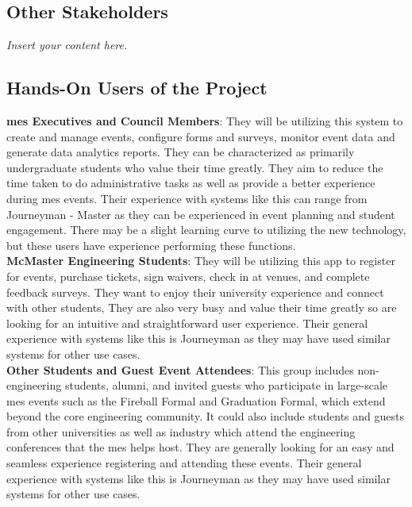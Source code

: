 \documentclass[12pt]{article}
\newcommand{\lips}{\textit{Insert your content here.}}
\begin{document}
\subsection{Other Stakeholders}
\lips
\subsection{Hands-On Users of the Project}
\textbf{\gls{mes} Executives and Council Members}: They will be utilizing this system to create and manage events,
configure forms and surveys, monitor event data and generate data analytics reports. They can be characterized as
primarily undergraduate students who value their time greatly. They aim to reduce the time taken to do administrative
tasks as well as provide a better experience during \gls{mes} events. Their experience with systems like this can range
from Journeyman - Master as they can be experienced in event planning and student engagement. There may be a slight
learning curve to utilizing the new technology, but these users have experience performing these functions.\\
\newline
\textbf{McMaster Engineering Students}: They will be utilizing this app to register for events, purchase tickets, sign
waivers, check in at venues, and complete feedback surveys. They want to enjoy their university experience and connect
with other students, They are also very busy and value their time greatly so are looking for an intuitive and
straightforward user experience. Their general experience with systems like this is Journeyman as they may have used
similar systems for other use cases. \\
\newline
\textbf{Other Students and Guest Event Attendees}: This group includes non-engineering students, alumni, and invited
guests who participate in large-scale \gls{mes} events such as the Fireball Formal and Graduation Formal, which extend
beyond the core engineering community. It could also include students and guests from other universities as well as
industry which attend the engineering conferences that the \gls{mes} helps host. They are generally looking for an easy
and seamless experience registering and attending these events. Their general experience with systems like this is
Journeyman as they may have used similar systems for other use cases.
\end{document}
